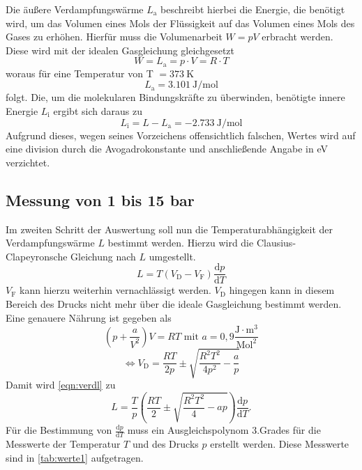 \noindent
Die äußere Verdampfungswärme $L_{\text{a}}$ beschreibt hierbei die Energie, die benötigt wird, um das Volumen eines Mols der Flüssigkeit auf das Volumen eines Mols des Gases zu
erhöhen. Hierfür muss die Volumenarbeit $W = pV$ erbracht werden. Diese wird mit der idealen Gasgleichung gleichgesetzt
\begin{equation*}
  W = L_{\text{a}} = p\cdot V = R \cdot T
\end{equation*}
woraus für eine Temperatur von T $= \SI{373}{\kelvin}$ 
\begin{equation*}
  L_{\text{a}} = \SI{3,101}{\joule\per\mole}  %
\end{equation*}
folgt.
\newline
Die, um die molekularen Bindungskräfte zu überwinden, benötigte innere Energie $L_{\text{i}}$ ergibt sich daraus zu
\begin{equation*}
  L_{\text{i}} = L - L_{\text{a}} = \SI{-2,733}{\joule\per\mole}  %
\end{equation*}
Aufgrund dieses, wegen seines Vorzeichens offensichtlich falschen, Wertes wird auf eine division durch die Avogadrokonstante und anschließende Angabe in eV verzichtet.

\subsection{Messung von 1 bis 15 bar}
Im zweiten Schritt der Auswertung soll nun die Temperaturabhängigkeit der Verdampfungswärme $L$ bestimmt werden. Hierzu wird die Clausius-Clapeyronsche Gleichung nach $L$ umgestellt.
\begin{equation}
  L = T(V_{\text{D}} - V_{\text{F}})\frac{\mathrm{d}p}{\mathrm{d}T}   %
  \label{eqn:verdl}
\end{equation}
$V_{\text{F}}$ kann hierzu weiterhin vernachlässigt werden. $V_{\text{D}}$ hingegen kann in diesem Bereich des Drucks nicht mehr über die ideale Gasgleichung bestimmt werden.
Eine genauere Nährung ist gegeben als 
\begin{equation*}
  \left(p+\frac{a}{V^2}\right)V = RT \, \, \mathrm{mit} \, \, a =  0,9 \mathrm{\frac{J \cdot m^3}{Mol^2}} 
\end{equation*}
\begin{equation*}
  \Leftrightarrow V_{\text{D}} = \frac{RT}{2p} \pm \sqrt{\frac{R^2T^2}{4p^2}-\frac{a}{p}}
\end{equation*}
Damit wird \ref{eqn:verdl} zu
\begin{equation}
  L = \frac{T}{p} \left(\frac{RT}{2} \pm \sqrt{\frac{R^2T^2}{4}-ap}\right)\frac{\mathrm{d}p}{\mathrm{d}T}. %
  \label{eqn:verdl2}
\end{equation}
Für die Bestimmung von $\frac{\mathrm{d}p}{\mathrm{d}T}$ muss ein Ausgleichspolynom 3.Grades für die Messwerte der Temperatur $T$ und des Drucks $p$ erstellt werden. 
Diese Messwerte sind in \autoref{tab:werte1} aufgetragen.

